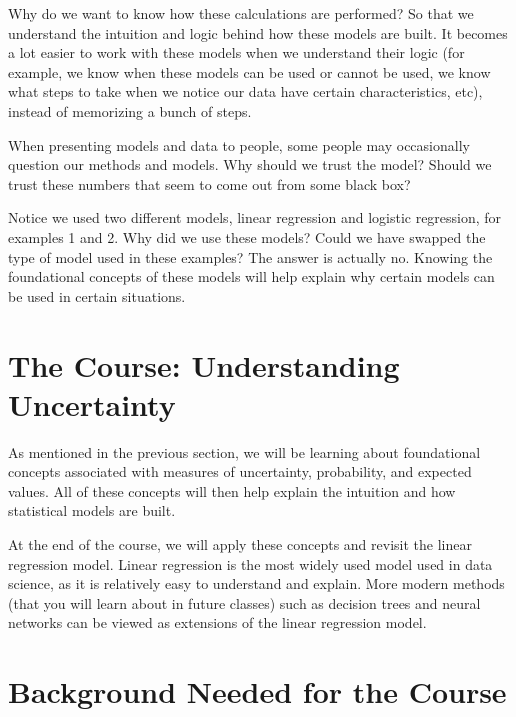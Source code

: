 \documentclass[
]{book}
\begin{document}
Why do we want to know how these calculations are performed? So that we understand the intuition and logic behind how these models are built. It becomes a lot easier to work with these models when we understand their logic (for example, we know when these models can be used or cannot be used, we know what steps to take when we notice our data have certain characteristics, etc), instead of memorizing a bunch of steps.

When presenting models and data to people, some people may occasionally question our methods and models. Why should we trust the model? Should we trust these numbers that seem to come out from some black box?

Notice we used two different models, linear regression and logistic regression, for examples 1 and 2. Why did we use these models? Could we have swapped the type of model used in these examples? The answer is actually no. Knowing the foundational concepts of these models will help explain why certain models can be used in certain situations.

\hypertarget{the-course-understanding-uncertainty}{%
\section*{The Course: Understanding Uncertainty}\label{the-course-understanding-uncertainty}}

As mentioned in the previous section, we will be learning about foundational concepts associated with measures of uncertainty, probability, and expected values. All of these concepts will then help explain the intuition and how statistical models are built.

At the end of the course, we will apply these concepts and revisit the linear regression model. Linear regression is the most widely used model used in data science, as it is relatively easy to understand and explain. More modern methods (that you will learn about in future classes) such as decision trees and neural networks can be viewed as extensions of the linear regression model.

\hypertarget{background-needed-for-the-course}{%
\section*{Background Needed for the Course}\label{background-needed-for-the-course}}
\end{document}
